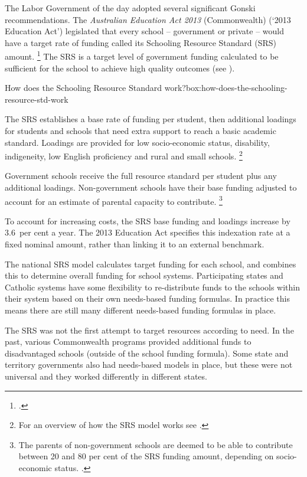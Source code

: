 \documentclass{grattan}
\begin{document}
The Labor Government of the day adopted several significant Gonski recommendations.
The \emph{Australian Education Act 2013} (Commonwealth) (`2013 Education Act') legislated that every school -- government or private -- would have a target rate of funding called its Schooling Resource Standard (SRS) amount.%
\footcite{2013AustralianEducationAct}
The SRS is a target level of government funding calculated to be sufficient for the school to achieve high quality outcomes (see ).

\begin{smallbox}{How does the Schooling Resource Standard work?}{box:how-does-the-schooling-resource-std-work}

The SRS establishes a base rate of funding per student, then additional loadings for students and schools that need extra support to reach a basic academic standard.
Loadings are provided for low socio-economic status, disability, indigeneity, low English proficiency and rural and small schools.%
\footnote{For an overview of how the SRS model works see \textcite{Independent2014SRSFundingModel}.}

Government schools receive the full resource standard per student plus any additional loadings.
Non-government schools have their base funding adjusted to account for an estimate of parental capacity to contribute.%
\footnote{The parents of non-government schools are deemed to be able to contribute between 20 and 80 per cent of the SRS funding amount, depending on socio-economic status. \textcite{ABS2016SchoolsAustralia}.}

To account for increasing costs, the SRS base funding and loadings increase by 3.6~per cent a year.
The 2013 Education Act specifies this indexation rate at a fixed nominal amount, rather than linking it to an external benchmark.

The national SRS model calculates target funding for each school, and combines this to determine overall funding for school systems.
Participating states and Catholic systems have some flexibility to re-distribute funds to the schools within their system based on their own needs-based funding formulas. In practice this means there are still many different needs-based funding formulas in place.
\end{smallbox}

The SRS was not the first attempt to target resources according to need.
In the past, various Commonwealth programs provided additional funds to disadvantaged schools (outside of the school funding formula).
Some state and territory governments also had needs-based models in place, but these were not universal and they worked differently in different states.
\end{document}
